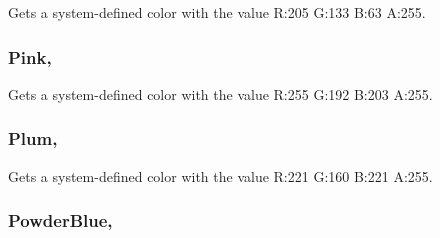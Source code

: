 Gets a system-\/defined color with the value R\+:205 G\+:133 B\+:63 A\+:255.

\hypertarget{structMicrosoft_1_1Xna_1_1Framework_1_1Color_ae30ac30d637ea4e65a888acc784667a4}{}
\subsubsection[{Pink}]{ Pink\hspace{0.3cm}{\ttfamily [static]}, {\ttfamily [get]}}\label{structMicrosoft_1_1Xna_1_1Framework_1_1Color_ae30ac30d637ea4e65a888acc784667a4}


Gets a system-\/defined color with the value R\+:255 G\+:192 B\+:203 A\+:255.

\hypertarget{structMicrosoft_1_1Xna_1_1Framework_1_1Color_a9a657ba240cf4d7bc20b7dcf9e40b6f4}{}
\subsubsection[{Plum}]{ Plum\hspace{0.3cm}{\ttfamily [static]}, {\ttfamily [get]}}\label{structMicrosoft_1_1Xna_1_1Framework_1_1Color_a9a657ba240cf4d7bc20b7dcf9e40b6f4}


Gets a system-\/defined color with the value R\+:221 G\+:160 B\+:221 A\+:255.

\hypertarget{structMicrosoft_1_1Xna_1_1Framework_1_1Color_a9291f40f2de88d671a1d2d24804376e4}{}
\subsubsection[{Powder\+Blue}]{ Powder\+Blue\hspace{0.3cm}{\ttfamily [static]}, {\ttfamily [get]}}\label{structMicrosoft_1_1Xna_1_1Framework_1_1Color_a9291f40f2de88d671a1d2d24804376e4}


